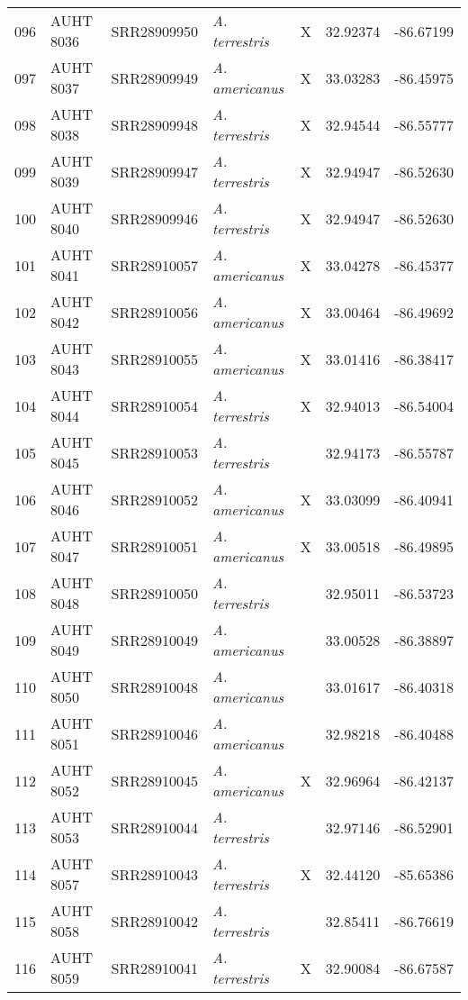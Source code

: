 \begin{longtable}{ lllllll }
096 & AUHT 8036 & SRR28909950 & \textit{A. terrestris} & X & 32.92374 & -86.67199 \\ 
097 & AUHT 8037 & SRR28909949 & \textit{A. americanus} & X & 33.03283 & -86.45975 \\ 
098 & AUHT 8038 & SRR28909948 & \textit{A. terrestris} & X & 32.94544 & -86.55777 \\ 
099 & AUHT 8039 & SRR28909947 & \textit{A. terrestris} & X & 32.94947 & -86.52630 \\ 
100 & AUHT 8040 & SRR28909946 & \textit{A. terrestris} & X & 32.94947 & -86.52630 \\ 
101 & AUHT 8041 & SRR28910057 & \textit{A. americanus} & X & 33.04278 & -86.45377 \\ 
102 & AUHT 8042 & SRR28910056 & \textit{A. americanus} & X & 33.00464 & -86.49692 \\ 
103 & AUHT 8043 & SRR28910055 & \textit{A. americanus} & X & 33.01416 & -86.38417 \\ 
104 & AUHT 8044 & SRR28910054 & \textit{A. terrestris} & X & 32.94013 & -86.54004 \\ 
105 & AUHT 8045 & SRR28910053 & \textit{A. terrestris} &  & 32.94173 & -86.55787 \\ 
106 & AUHT 8046 & SRR28910052 & \textit{A. americanus} & X & 33.03099 & -86.40941 \\ 
107 & AUHT 8047 & SRR28910051 & \textit{A. americanus} & X & 33.00518 & -86.49895 \\ 
108 & AUHT 8048 & SRR28910050 & \textit{A. terrestris} &  & 32.95011 & -86.53723 \\ 
109 & AUHT 8049 & SRR28910049 & \textit{A. americanus} &  & 33.00528 & -86.38897 \\ 
110 & AUHT 8050 & SRR28910048 & \textit{A. americanus} &  & 33.01617 & -86.40318 \\ 
111 & AUHT 8051 & SRR28910046 & \textit{A. americanus} &  & 32.98218 & -86.40488 \\ 
112 & AUHT 8052 & SRR28910045 & \textit{A. americanus} & X & 32.96964 & -86.42137 \\ 
113 & AUHT 8053 & SRR28910044 & \textit{A. terrestris} &  & 32.97146 & -86.52901 \\ 
114 & AUHT 8057 & SRR28910043 & \textit{A. terrestris} & X & 32.44120 & -85.65386 \\ 
115 & AUHT 8058 & SRR28910042 & \textit{A. terrestris} &  & 32.85411 & -86.76619 \\ 
116 & AUHT 8059 & SRR28910041 & \textit{A. terrestris} & X & 32.90084 & -86.67587 \\ 

\end{longtable}
